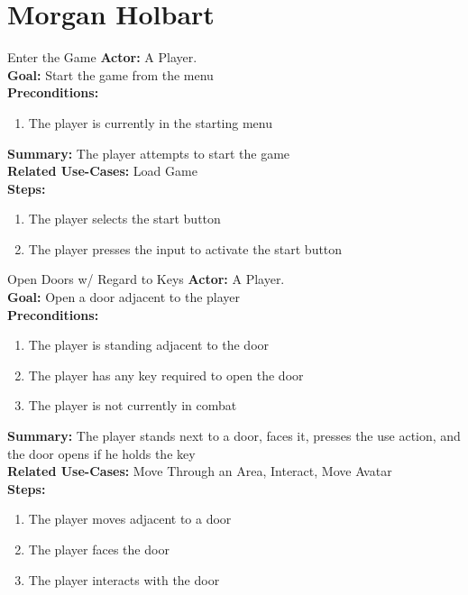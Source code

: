 \documentclass[12pt]{report}
\begin{document}
\section{Morgan Holbart}
\begin{subsection}{Enter the Game}
\textbf{Actor:} A Player. \\
\textbf{Goal:} Start the game from the menu \\
\textbf{Preconditions:}
\begin{enumerate}
	\item The player is currently in the starting menu
\end{enumerate}
\textbf{Summary:} The player attempts to start the game \\
\textbf{Related Use-Cases:} Load Game \\
\textbf{Steps:}
\begin{enumerate}
	\item The player selects the start button
	\item The player presses the input to activate the start button
\end{enumerate}
\end{subsection}
\begin{subsection}{Open Doors w/ Regard to Keys}
\textbf{Actor:} A Player. \\
\textbf{Goal:} Open a door adjacent to the player \\
\textbf{Preconditions:}
\begin{enumerate}
	\item The player is standing adjacent to the door
	\item The player has any key required to open the door
	\item The player is not currently in combat
\end{enumerate}
\textbf{Summary:} The player stands next to a door, faces it, presses the use action, and the door opens if he holds the key \\
\textbf{Related Use-Cases:} Move Through an Area, Interact, Move Avatar \\
\textbf{Steps:}
\begin{enumerate}
	\item The player moves adjacent to a door
	\item The player faces the door
	\item The player interacts with the door
\end{enumerate}
\end{subsection}
\end{document}
